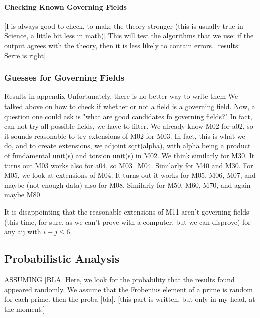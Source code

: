 \paragraph{Checking Known Governing Fields}
[I is always good to check, to make the theory stronger (this is usually true in Science, a little bit less in math)]
This will test the algorithms that we use: if the output agrees with the theory, then it is less likely to contain errors.
[results: Serre is right]

\subsubsection{Guesses for Governing Fields}
Results in appendix
Unfortunately, there is no better way to write them
We talked above on how to check if whether or not a field is a governing field.
Now, a question one could ask is "what are good candidates fo governing fields?"
In fact, can not try all possible fields, we have to filter.
We already know M02 for a02, so it sounds reasonable to try extensions of M02 for M03.
In fact, this is what we do, and to create extensions, we adjoint sqrt(alpha), with alpha being a product of fundamental unit(s) and torsion unit(s) in M02.
We think similarly for M30.
It turns out M03 works also for a04, so M03=M04.
Similarly for M40 and M30.
For M05, we look at extensions of M04.
It turns out it works for M05, M06, M07, and maybe (not enough data) also for M08.
Similarly for M50, M60, M70, and again maybe M80.

It is disappointing that the reasonable extensions of M11 aren't governing fields (this time, for sure, as we can't prove with a computer, but we can disprove) for any aij with $i+j \leq 6$



\subsection{Probabilistic Analysis}
ASSUMING [BLA]
Here, we look for the probability that the results found appeared randomly.
We assume that the Frobenius element of a prime is random for each prime.
then the proba [bla].
[this part is written, but only in my head, at the moment.]



